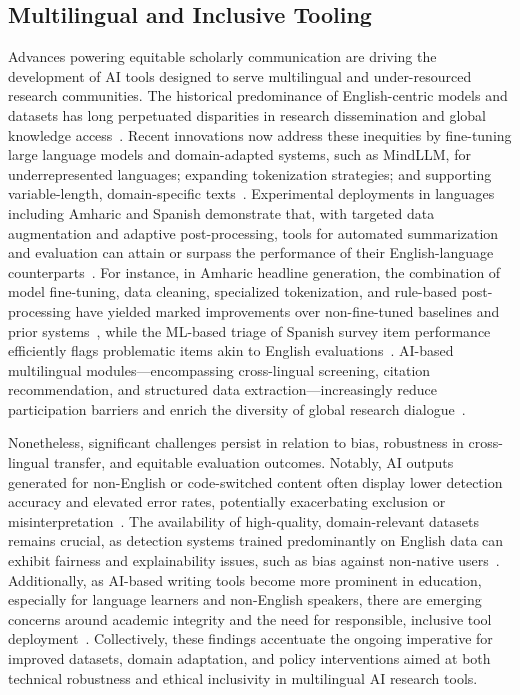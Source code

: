 \documentclass[sigconf]{acmart}
\begin{document}
\subsection{Multilingual and Inclusive Tooling}

Advances powering equitable scholarly communication are driving the development of AI tools designed to serve multilingual and under-resourced research communities. The historical predominance of English-centric models and datasets has long perpetuated disparities in research dissemination and global knowledge access~\cite{ref90,ref93,ref97,ref98,ref100,ref104,ref105,ref110}. Recent innovations now address these inequities by fine-tuning large language models and domain-adapted systems, such as MindLLM, for underrepresented languages; expanding tokenization strategies; and supporting variable-length, domain-specific texts~\cite{ref90,ref97,ref100,ref105,ref110}. Experimental deployments in languages including Amharic and Spanish demonstrate that, with targeted data augmentation and adaptive post-processing, tools for automated summarization and evaluation can attain or surpass the performance of their English-language counterparts~\cite{ref93,ref97,ref98,ref104,ref105,ref110}. For instance, in Amharic headline generation, the combination of model fine-tuning, data cleaning, specialized tokenization, and rule-based post-processing have yielded marked improvements over non-fine-tuned baselines and prior systems~\cite{ref105}, while the ML-based triage of Spanish survey item performance efficiently flags problematic items akin to English evaluations~\cite{ref93}. AI-based multilingual modules—encompassing cross-lingual screening, citation recommendation, and structured data extraction—increasingly reduce participation barriers and enrich the diversity of global research dialogue~\cite{ref90,ref93,ref98,ref105}.

Nonetheless, significant challenges persist in relation to bias, robustness in cross-lingual transfer, and equitable evaluation outcomes. Notably, AI outputs generated for non-English or code-switched content often display lower detection accuracy and elevated error rates, potentially exacerbating exclusion or misinterpretation~\cite{ref90,ref93,ref98,ref100,ref105,ref110}. The availability of high-quality, domain-relevant datasets remains crucial, as detection systems trained predominantly on English data can exhibit fairness and explainability issues, such as bias against non-native users~\cite{ref100}. Additionally, as AI-based writing tools become more prominent in education, especially for language learners and non-English speakers, there are emerging concerns around academic integrity and the need for responsible, inclusive tool deployment~\cite{ref97,ref98,ref110}. Collectively, these findings accentuate the ongoing imperative for improved datasets, domain adaptation, and policy interventions aimed at both technical robustness and ethical inclusivity in multilingual AI research tools.
\end{document}
